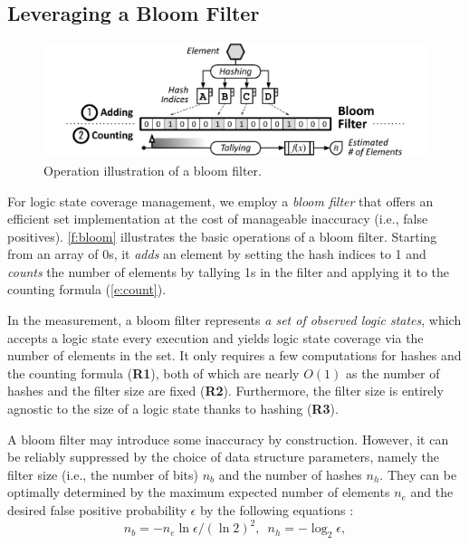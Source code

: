 \documentclass[letterpaper,twocolumn,10pt]{article}
\begin{document}
\subsection{Leveraging a Bloom Filter}
\label{s:measure:bloom}

\begin{figure}[t]
  \centering
  \includegraphics[width=\columnwidth]{images/bloom.pdf}
  \caption{Operation illustration of a bloom filter.}
  \label{f:bloom}
\end{figure}


For logic state coverage management, we employ a \emph{bloom filter} that 
offers an %
efficient set implementation at the cost of manageable inaccuracy (i.e., false
positives).
%
%
\autoref{f:bloom} illustrates the basic operations of a bloom filter. Starting
from an array of 0s, it \emph{adds} an element by setting the hash indices to 1
and \emph{counts} the number of elements by tallying 1s in the filter and
applying it to the counting formula (\autoref{e:count}).


%
%
In the measurement, a bloom filter represents \emph{a set of observed logic
states}, which accepts a logic state every execution and yields logic state
coverage via the number of elements in the set. It only requires a few
computations for hashes and the counting formula (\textbf{R1}), both of which
are nearly $O(1)$ as the number of hashes and the filter size are fixed
(\textbf{R2}). Furthermore, the filter size is entirely agnostic to the size of
a logic state thanks to hashing (\textbf{R3}). 

%
A bloom filter may introduce some inaccuracy by construction. However, it can
be reliably suppressed by the choice of data structure parameters, namely the
filter size (i.e., the number of bits) $n_b$ and the number of hashes $n_h$.
They can be optimally determined by the maximum expected number of elements
$n_e$ and the desired false positive probability $\epsilon$ by the following
equations \cite{tarkoma2012bloom}:
%
\begin{equation}
  n_b = -n_e\ln{\epsilon}/(\ln{2})^2, \enspace n_h = -\log_2{\epsilon},
  \label{e:param}
\end{equation}
\end{document}
